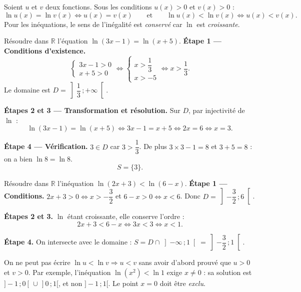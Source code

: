 \documentclass[11pt]{article}
\begin{document}
\begin{propriete}[Équations et inéquations du type $\ln u = \ln v$]
Soient $u$ et $v$ deux fonctions. Sous les conditions $u(x) > 0$ et $v(x) > 0$ :
\[ \ln u(x) = \ln v(x) \iff u(x) = v(x) \qquad\text{et}\qquad \ln u(x) < \ln v(x) \iff u(x) < v(x). \]
Pour les inéquations, le sens de l'inégalité est \emph{conservé} car $\ln$ est \emph{croissante}.
\end{propriete}

\begin{exoresolu}[Équation du type $\ln u = \ln v$]
Résoudre dans $\mathbb{R}$ l'équation $\ln(3x - 1) = \ln(x + 5)$.
\tcblower
\textbf{Étape 1 — Conditions d'existence.}
\[ \begin{cases} 3x - 1 > 0 \\ x + 5 > 0 \end{cases} \iff \begin{cases} x > \dfrac{1}{3} \\ x > -5 \end{cases} \iff x > \dfrac{1}{3}. \]
Le domaine est $D = \left]\dfrac{1}{3}\,;+\infty\right[$.

\textbf{Étapes 2 et 3 — Transformation et résolution.} Sur $D$, par injectivité de $\ln$ :
\[ \ln(3x-1) = \ln(x+5) \iff 3x - 1 = x + 5 \iff 2x = 6 \iff x = 3. \]

\textbf{Étape 4 — Vérification.} $3 \in D$ car $3 > \dfrac{1}{3}$. De plus $3\times 3 - 1 = 8$ et $3 + 5 = 8$ : on a bien $\ln 8 = \ln 8$.
\[ S = \{3\}. \]
\end{exoresolu}

\begin{exoresolu}
Résoudre dans $\mathbb{R}$ l'inéquation $\ln(2x + 3) < \ln(6 - x)$.
\tcblower
\textbf{Étape 1 — Conditions.} $2x + 3 > 0 \iff x > -\dfrac{3}{2}$ et $6 - x > 0 \iff x < 6$. Donc $D = \left]-\dfrac{3}{2}\,;6\right[$.

\textbf{Étapes 2 et 3.} $\ln$ étant croissante, elle conserve l'ordre :
\[ 2x + 3 < 6 - x \iff 3x < 3 \iff x < 1. \]

\textbf{Étape 4.} On intersecte avec le domaine : $S = D \cap \left]-\infty\,;1\right[ = \left]-\dfrac{3}{2}\,;1\right[$.
\end{exoresolu}

\begin{attention}
On ne peut pas écrire $\ln u < \ln v \Rightarrow u < v$ sans avoir d'abord prouvé que $u > 0$ et $v > 0$. Par exemple, l'inéquation $\ln(x^2) < \ln 1$ exige $x \neq 0$ : sa solution est $]-1\,;0[\,\cup\,]0\,;1[$, et non $]-1\,;1[$. Le point $x = 0$ doit être \emph{exclu}.
\end{attention}
\end{document}

